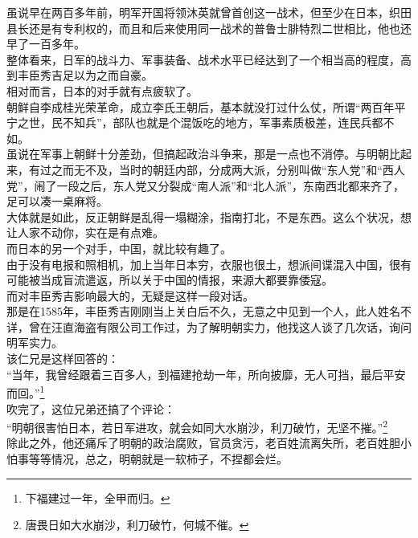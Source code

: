 \begin{multicols}{\theparacolNo}
虽说早在两百多年前，明军开国将领沐英就曾首创这一战术，但至少在日本，织田县长还是有专利权的，而且和后来使用同一战术的普鲁士腓特烈二世相比，他也还早了一百多年。\\

整体看来，日军的战斗力、军事装备、战术水平已经达到了一个相当高的程度，高到丰臣秀吉足以为之而自豪。\\

相对而言，日本的对手就有点疲软了。\\

朝鲜自李成桂光荣革命，成立李氏王朝后，基本就没打过什么仗，所谓“两百年平宁之世，民不知兵”，部队也就是个混饭吃的地方，军事素质极差，连民兵都不如。\\

虽说在军事上朝鲜十分差劲，但搞起政治斗争来，那是一点也不消停。与明朝比起来，有过之而无不及，当时的朝廷内部，分成两大派，分别叫做“东人党”和“西人党”，闹了一段之后，东人党又分裂成“南人派”和“北人派”，东南西北都来齐了，足可以凑一桌麻将。\\

大体就是如此，反正朝鲜是乱得一塌糊涂，指南打北，不是东西。这么个状况，想让人家不动你，实在是有点难。\\

而日本的另一个对手，中国，就比较有趣了。\\

由于没有电报和照相机，加上当年日本穷，衣服也很土，想派间谍混入中国，很有可能被当成盲流遣返，所以关于中国的情报，来源大都要靠倭寇。\\

而对丰臣秀吉影响最大的，无疑是这样一段对话。\\

那是在1585年，丰臣秀吉刚刚当上关白后不久，无意之中见到一个人，此人姓名不详，曾在汪直海盗有限公司工作过，为了解明朝实力，他找这人谈了几次话，询问明军实力。\\

该仁兄是这样回答的：\\

“当年，我曾经跟着三百多人，到福建抢劫一年，所向披靡，无人可挡，最后平安而回。”\footnote{下福建过一年，全甲而归。}\\

吹完了，这位兄弟还搞了个评论：\\

“明朝很害怕日本，若日军进攻，就会如同大水崩沙，利刀破竹，无坚不摧。”\footnote{唐畏日如大水崩沙，利刀破竹，何城不催。}\\

除此之外，他还痛斥了明朝的政治腐败，官员贪污，老百姓流离失所，老百姓胆小怕事等等情况，总之，明朝就是一软柿子，不捏都会烂。\\


\end{multicols}
